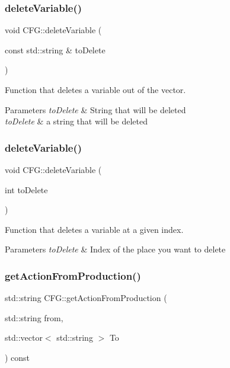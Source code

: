 \subsubsection{\texorpdfstring{delete\+Variable()}{deleteVariable()}\hspace{0.1cm}{\footnotesize\ttfamily [1/2]}}
{\footnotesize\ttfamily void C\+F\+G\+::delete\+Variable (\begin{DoxyParamCaption}\item[{const std\+::string \&}]{to\+Delete }\end{DoxyParamCaption})}



Function that deletes a variable out of the vector. 


\begin{DoxyParams}{Parameters}
{\em to\+Delete} & String that will be deleted\\
\hline
{\em to\+Delete} & a string that will be deleted \\
\hline
\end{DoxyParams}
\mbox{\label{classCFG_a8f1e0eec88b6a019c728bac520d18336}} 
\subsubsection{\texorpdfstring{delete\+Variable()}{deleteVariable()}\hspace{0.1cm}{\footnotesize\ttfamily [2/2]}}
{\footnotesize\ttfamily void C\+F\+G\+::delete\+Variable (\begin{DoxyParamCaption}\item[{int}]{to\+Delete }\end{DoxyParamCaption})}



Function that deletes a variable at a given index. 


\begin{DoxyParams}{Parameters}
{\em to\+Delete} & Index of the place you want to delete \\
\hline
\end{DoxyParams}
\mbox{\label{classCFG_a89ff398f5c7797b921fab30648a92b8b}} 
\subsubsection{\texorpdfstring{get\+Action\+From\+Production()}{getActionFromProduction()}}
{\footnotesize\ttfamily std\+::string C\+F\+G\+::get\+Action\+From\+Production (\begin{DoxyParamCaption}\item[{std\+::string}]{from,  }\item[{std\+::vector$<$ std\+::string $>$}]{To }\end{DoxyParamCaption}) const}



